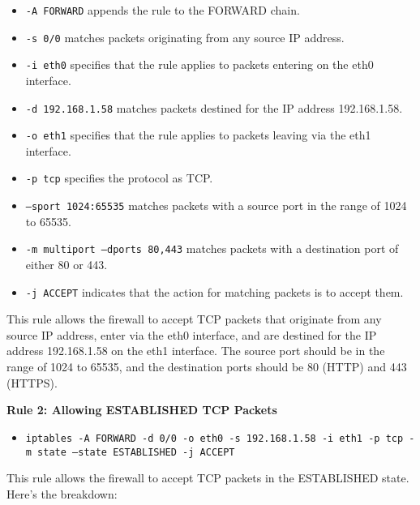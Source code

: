 {{		\begin{itemize}
			\item \texttt{-A FORWARD} appends the rule to the FORWARD chain.
			\item \texttt{-s 0/0} matches packets originating from any source IP address.
			\item \texttt{-i eth0} specifies that the rule applies to packets entering on the eth0 interface.
			\item \texttt{-d 192.168.1.58} matches packets destined for the IP address 192.168.1.58.
			\item \texttt{-o eth1} specifies that the rule applies to packets leaving via the eth1 interface.
			\item \texttt{-p tcp} specifies the protocol as TCP.
			\item \texttt{--sport 1024:65535} matches packets with a source port in the range of 1024 to 65535.
			\item \texttt{-m multiport --dports 80,443} matches packets with a destination port of either 80 or 443.
			\item \texttt{-j ACCEPT} indicates that the action for matching packets is to accept them.
		\end{itemize}
		
		This rule allows the firewall to accept TCP packets that originate from any source IP address, enter via the eth0 interface, and are destined for the IP address 192.168.1.58 on the eth1 interface. The source port should be in the range of 1024 to 65535, and the destination ports should be 80 (HTTP) and 443 (HTTPS).
		
		\textbf{Rule 2: Allowing ESTABLISHED TCP Packets}
		
		\begin{itemize}
			\item \texttt{iptables -A FORWARD -d 0/0 -o eth0 -s 192.168.1.58 -i eth1 -p tcp -m state --state ESTABLISHED -j ACCEPT}
		\end{itemize}
		
		This rule allows the firewall to accept TCP packets in the ESTABLISHED state. Here's the breakdown:
		
}}
